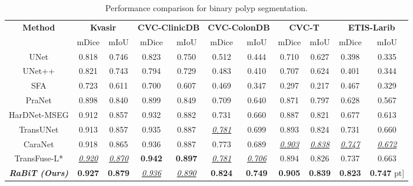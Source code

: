 \documentclass{article}
\begin{document}
\begin{table*}[!ht]
\caption{Performance comparison for binary polyp segmentation.}
\centering
{\renewcommand{\arraystretch}{1.0}
\begin{tabular}{c|cc|cc|cc|cc|cc}
\hline
\multirow{2}{*}{\textbf{Method}} & \multicolumn{2}{c|}{\textbf{Kvasir}} & \multicolumn{2}{c|}{\textbf{CVC-ClinicDB}} & \multicolumn{2}{c|}{\textbf{CVC-ColonDB}} & \multicolumn{2}{c|}{\textbf{CVC-T}} & \multicolumn{2}{c}{\textbf{ETIS-Larib}}  \\
\cline{2-11}
& mDice & mIoU               & mDice & mIoU                 & mDice & mIoU                & mDice & mIoU                   & mDice & mIoU              \\
\hline
UNet \cite{unet}           & 0.818 & 0.746 & 0.823 & 0.750 & 0.512 & 0.444 & 0.710 & 0.627  & 0.398 & 0.335 \\
UNet++ \cite{unet++}         & 0.821 & 0.743 & 0.794 & 0.729 & 0.483 & 0.410 & 0.707 & 0.624  & 0.401 & 0.344 \\
SFA   \cite{sfa}                      & 0.723 & 0.611 & 0.700 & 0.607 & 0.469 & 0.347 & 0.297 & 0.217 & 0.467 & 0.329\\
PraNet \cite{pranet}         & 0.898 & 0.840 & 0.899 & 0.849 & 0.709 & 0.640 & 0.871 & 0.797  & 0.628 & 0.567 \\
HarDNet-MSEG \cite{hardnet_mseg}  & 0.912 & 0.857 & 0.932 & 0.882 & 0.731 & 0.660 & 0.887 & 0.821  & 0.677 & 0.613 \\
TransUNet \cite{transunet}   & 0.913 & 0.857 & 0.935 & 0.887 & \underline{\textit{0.781}} & 0.699 & 0.893 & 0.824 & 0.731 & 0.660   \\
CaraNet \cite{caranet}          & 0.918 & 0.865 & 0.936 & 0.887 & 0.773 & 0.689 & \underline{\textit{0.903}} & \underline{\textit{0.838}} & \underline{\textit{0.747}} & \underline{\textit{0.672}}\\
TransFuse-L* \cite{transfuse}   & \underline{\textit{0.920}} & \underline{\textit{0.870}} & \textbf{0.942} & \textbf{0.897} & \underline{\textit{0.781}} & \underline{\textit{0.706}} & 0.894 & 0.826 & 0.737 & 0.663\\


\textit{\textbf{RaBiT (Ours)}} & \textbf{0.927} & \textbf{0.879} & \underline{\textit{0.936}} & \underline{\textit{0.890}} & 
\textbf{0.824} & \textbf{0.749} & \textbf{0.905} & \textbf{0.839} & \textbf{0.823} & \textbf{0.747} \2pt]
\hline
\end{tabular}
}
\label{tab:neo-sota}
\end{table*}
\end{document}
